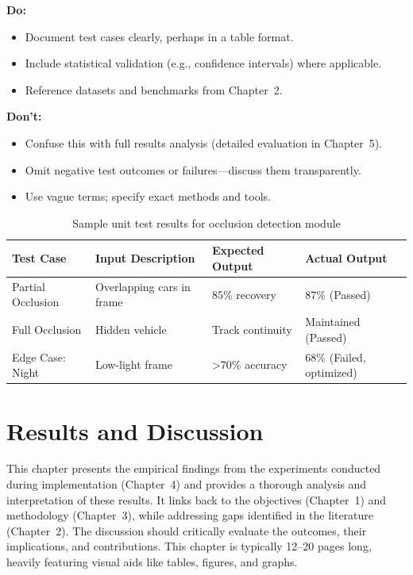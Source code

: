 \documentclass[12pt,a4paper]{report}
\theoremstyle{definition}
\theoremstyle{remark}
\begin{document}
\noindent \textbf{Do:}
\begin{itemize}
    \item Document test cases clearly, perhaps in a table format.
    \item Include statistical validation (e.g., confidence intervals) where applicable.
    \item Reference datasets and benchmarks from Chapter~2.
\end{itemize}

\noindent \textbf{Don’t:}
\begin{itemize}
    \item Confuse this with full results analysis (detailed evaluation in Chapter~5).
    \item Omit negative test outcomes or failures—discuss them transparently.
    \item Use vague terms; specify exact methods and tools.
\end{itemize}

\begin{table}[htbp]
    \centering
    \caption{Sample unit test results for occlusion detection module}
    \label{tab:test-results}
    \begin{tabular}{|l|l|l|l|}
    \hline
    \textbf{Test Case} & \textbf{Input Description} & \textbf{Expected Output} & \textbf{Actual Output} \\
    \hline
    Partial Occlusion & Overlapping cars in frame & 85\% recovery & 87\% (Passed) \\
    Full Occlusion & Hidden vehicle & Track continuity & Maintained (Passed) \\
    Edge Case: Night & Low-light frame & >70\% accuracy & 68\% (Failed, optimized) \\
    \hline
    \end{tabular}
\end{table}



\chapter{Results and Discussion}

This chapter presents the empirical findings from the experiments conducted during implementation (Chapter~4) and provides a thorough analysis and interpretation of these results. It links back to the objectives (Chapter~1) and methodology (Chapter~3), while addressing gaps identified in the literature (Chapter~2). The discussion should critically evaluate the outcomes, their implications, and contributions. This chapter is typically 12--20 pages long, heavily featuring visual aids like tables, figures, and graphs.
\end{document}
